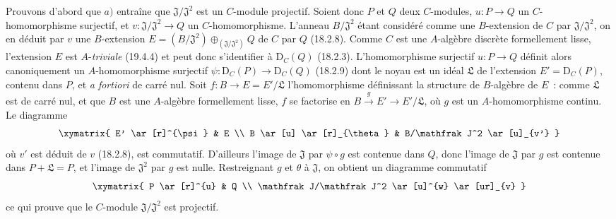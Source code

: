 \begin{env}[19.5.4.1]
\label{0.19.5.4.1-fr}
Prouvons d'abord que $a)$ entraîne que $\mathfrak J/\mathfrak J^2$ est un
$C$-module projectif. Soient donc $P$ et $Q$ deux $C$-modules,
$u:P\to Q$ un $C$-homomorphisme surjectif, et
$v:\mathfrak J/\mathfrak J^2\to Q$ un $C$-homomorphisme. L'anneau
$B/\mathfrak J^2$ étant considéré comme une $B$-extension de $C$ par
$\mathfrak J/\mathfrak J^2$, on en déduit par $v$ une $B$-extension
$E=(B/\mathfrak J^2)\oplus_{(\mathfrak J/\mathfrak J^2)}Q$ de $C$ par $Q$
(18.2.8). Comme $C$ est une $A$-algèbre discrète formellement lisse,
l'extension $E$ est $A$-\emph{triviale} (19.4.4) et peut donc s'identifier à
$\mathrm D_C(Q)$ (18.2.3). L'homomorphisme surjectif $u:P\to Q$ définit alors
canoniquement un $A$-homomorphisme surjectif
$\psi:\mathrm D_C(P)\to\mathrm D_C(Q)$ (18.2.9) dont le noyau est un idéal
$\mathfrak L$ de l'extension $E'=\mathrm D_C(P)$, contenu dans $P$, et
\emph{a fortiori} de carré nul. Soit $f:B\to E=E'/\mathfrak L$
l'homomorphisme définissant la structure de $B$-algèbre de $E$~: comme
$\mathfrak L$ est de carré nul, et que $B$ est une $A$-algèbre
formellement
lisse, $f$ se factorise en $B\xrightarrow{g}E'\to E'/\mathfrak L$, où $g$ est
un $A$-homomorphisme continu.
Le diagramme
\[
  \xymatrix{
    E' \ar[r]^{\psi} & E \\
    B \ar[u] \ar[r]_{\theta} & B/\mathfrak J^2 \ar[u]_{v'}
  }
\]
où $v'$ est déduit de $v$ (18.2.8), est commutatif. D'ailleurs l'image de
$\mathfrak J$ par $\psi\circ g$ est contenue dans $Q$, donc l'image de
$\mathfrak J$ par $g$ est contenue dans $P+\mathfrak L=P$, et l'image de
$\mathfrak J^2$ par $g$ est nulle. Restreignant $g$ et $\theta$ à
$\mathfrak J$, on obtient un diagramme commutatif
\[
  \xymatrix{
    P \ar[r]^{u} & Q \\
    \mathfrak J/\mathfrak J^2 \ar[u]^{w} \ar[ur]_{v}
  }
\]
ce qui prouve que le $C$-module $\mathfrak J/\mathfrak J^2$ est projectif.
\end{env}

